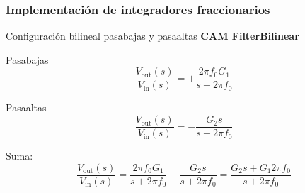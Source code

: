 \documentclass[10pt]{beamer}
\begin{document}
	\begin{frame}
		\frametitle{Implementación de integradores fraccionarios}
		\begin{block}{Configuración bilineal pasabajas y pasaaltas}
		\textbf{CAM FilterBilinear}
			
	Pasabajas
	\begin{equation}
		\frac{V_{\mathrm{out}} (s)}{V_{\mathrm{in}}(s)} =  \pm \frac{2 \pi f_{0} G_{1}}{s + 2 \pi f_{0}}  
		\label{ec:CAM_bilinear_pasabajas}
	\end{equation}
	
	Pasaaltas
	\begin{equation}
	\frac{V_{\mathrm{out}} (s)}{V_{\mathrm{in}}(s)} =  - \frac{ G_{2} s}{s + 2 \pi f_{0}}
	\end{equation}
	
	Suma:
	\begin{equation}
		\frac{V_{\mathrm{out}} (s)}{V_{\mathrm{in}}(s)} = \frac{2 \pi f_{0} G_{1}}{s + 2 \pi f_{0}} + \frac{ G_{2} s}{s + 2 \pi f_{0}} = \frac{G_{2}s + G_{1}2 \pi f_{0}}{s + 2 \pi f_{0}}
		\label{ec:fun_trans_suma_filtros}
	\end{equation}
		\end{block}
	\end{frame}
\end{document}
